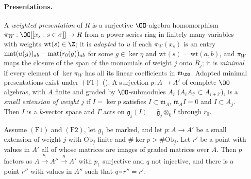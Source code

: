 \paragraph{Presentations.} A \emph{weighted presentation} of $R$ is a surjective $\OO$-algebra homomorphism
$\pi_W:\OO[[x_s:s\in\sigma]]\to R$ from a power series ring in finitely many variables with weights $\mathrm{wt}(s)\in\Z$; it is
\emph{adapted} to $u$ if each $\pi_W(x_s)$ is an entry $\mathrm{mat}(u(g))_{ab}-\mathrm{mat}(r_0(g))_{ab}$ for some $g\in\ker\eta$ and
$\mathrm{wt}(s)=\mathrm{wt}(a,b)$, and $\pi_W$ maps the closure of the span of the monomials of weight $j$ onto $R_j$; it is \emph{minimal} if
every element of $\ker\pi_W$ has all its linear coefficients in $\mathfrak m_\OO$. Adapted minimal presentations exist under
$(\mathrm{F1})$ (). A surjection $p:A\to A'$ of complete $\OO$-algebras, with
$A$ finite and graded by $\OO$-submodules $A_i$ ($A_iA_{i'}\subset A_{i+i'}$), is a \emph{small extension of weight $j$} if
$I=\ker p$ satisfies $I\subset\mathfrak m_A$, $\mathfrak m_AI=0$ and $I\subset A_j$. Then $I$ is a $k$-vector space and $\Gamma$ acts on
$\mathfrak g_j(I)=\bar{\mathfrak g}_j\otimes_kI$ through $\bar r_0$.

\begin{lemma}[Obstructions]\label{pf:eis:obs}
Assume $(\mathrm{F1})$ and $(\mathrm{F2})$, let $g_1$ be marked, and let $p:A\to A'$ be a small extension of weight $j$ with
$\mathrm{Ob}_j$ finite and $\#\ker p>\#\mathrm{Ob}_j$. Let $r'$ be a point with values in $A'$ all of whose matrices are images of graded
matrices over $A$. Then $p$ factors as $A\xrightarrow{p_1}A''\xrightarrow{q}A'$ with $p_1$ surjective and $q$ not injective, and there is a
point $r''$ with values in $A''$ such that $q\circ r''=r'$.
\end{lemma}

